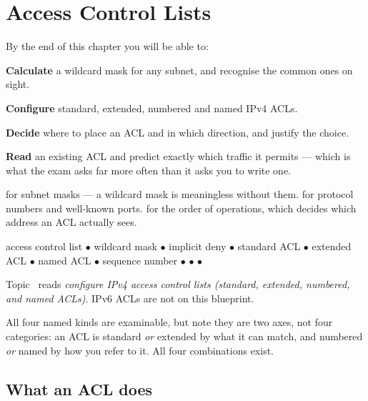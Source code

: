 \chapter{Access Control Lists}\label{ch:acl}

\begin{outcomes}
By the end of this chapter you will be able to:
\begin{tight}
  \item \textbf{Calculate} a wildcard mask for any subnet, and recognise the
        common ones on sight.
  \item \textbf{Configure} standard, extended, numbered and named IPv4 ACLs.
  \item \textbf{Decide} where to place an ACL and in which direction, and justify
        the choice.
  \item \textbf{Read} an existing ACL and predict exactly which traffic it permits
        --- which is what the exam asks far more often than it asks you to write
        one.
\end{tight}
\end{outcomes}

\begin{prereq}
 for subnet masks --- a wildcard mask is meaningless without them.
 for protocol numbers and well-known ports.  for the
order of operations, which decides which address an ACL actually sees.
\end{prereq}

\begin{keyterms}
access control list $\bullet$ wildcard mask $\bullet$ implicit deny $\bullet$
standard ACL $\bullet$ extended ACL $\bullet$ named ACL $\bullet$ sequence number
$\bullet$  $\bullet$  $\bullet$
\end{keyterms}

\begin{examnote}
Topic~ reads \emph{configure IPv4 access control lists (standard,
extended, numbered, and named ACLs)}. IPv6 ACLs are not on this blueprint.

All four named kinds are examinable, but note they are two axes, not four
categories: an ACL is standard \emph{or} extended by what it can match, and
numbered \emph{or} named by how you refer to it. All four combinations exist.
\end{examnote}

\section{What an ACL does}

